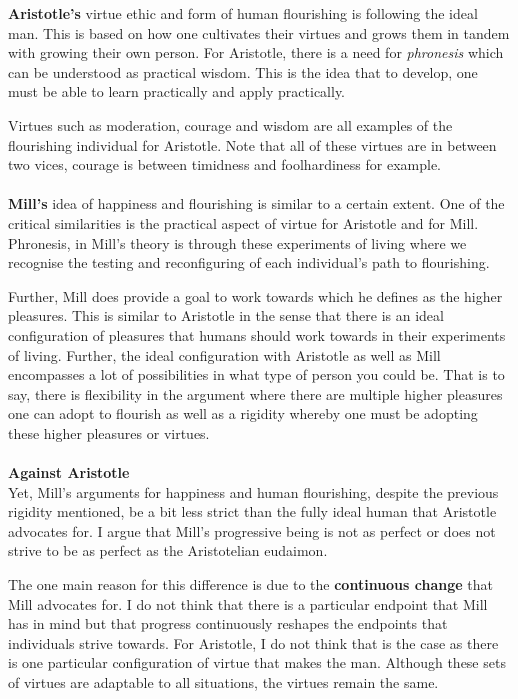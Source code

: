 \documentclass[12pt, letterpaper]{article}
\begin{document}
\textbf{Aristotle's} virtue ethic and form of human flourishing is following the ideal man. This is based on how one cultivates their virtues and grows them in tandem with growing their own person. For Aristotle, there is a need for \textit{phronesis} which can be understood as practical wisdom.
This is the idea that to develop, one must be able to learn practically and apply practically.

Virtues such as moderation, courage and wisdom are all examples of the flourishing individual for Aristotle. Note that all of these virtues are in between two vices, courage is between timidness and foolhardiness for example.
\\\\
\textbf{Mill's} idea of happiness and flourishing is similar to a certain extent. One of the critical similarities is the practical aspect of virtue for Aristotle and for Mill. Phronesis, in Mill's theory is through these experiments of living where we recognise the testing and reconfiguring of each individual's path to flourishing.

Further, Mill does provide a goal to work towards which he defines as the higher pleasures. This is similar to Aristotle in the sense that there is an ideal configuration of pleasures that humans should work towards in their experiments of living. Further, the ideal configuration with Aristotle as well as Mill encompasses a lot of possibilities in what type of person you could be. That is to say, there is flexibility in the argument where there are multiple higher pleasures one can adopt to flourish as well as a rigidity whereby one must be adopting these higher pleasures or virtues.
\\\\
\textbf{Against Aristotle}\\
Yet, Mill's arguments for happiness and human flourishing, despite the previous rigidity mentioned, be a bit less strict than the fully ideal human that Aristotle advocates for. I argue that Mill's progressive being is not as perfect or does not strive to be as perfect as the Aristotelian eudaimon.

The one main reason for this difference is due to the \textbf{continuous change} that Mill advocates for. I do not think that there is a particular endpoint that Mill has in mind but that progress continuously reshapes the endpoints that individuals strive towards. For Aristotle, I do not think that is the case as there is one particular configuration of virtue that makes the man. Although these sets of virtues are adaptable to all situations, the virtues remain the same.
\end{document}
